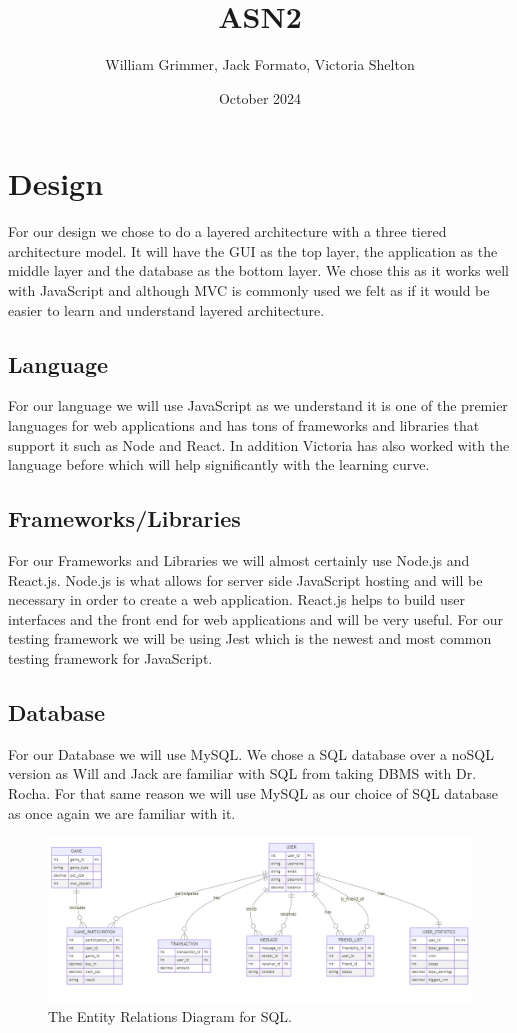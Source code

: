 \documentclass{article}
\title{ASN2}
\author{William Grimmer, Jack Formato, Victoria Shelton}
\date{October 2024}
\begin{document}
\maketitle

\section{Design}
For our design we chose to do a layered architecture with a three tiered architecture model. It will have the GUI as the top layer, the application as the middle layer and the database as the bottom layer. We chose this as it works well with JavaScript and although MVC is commonly used we felt as if it would be easier to learn and understand layered architecture.

\subsection{Language}
For our language we will use JavaScript as we understand it is one of the premier languages for web applications and has tons of frameworks and libraries that support it such as Node and React. In addition Victoria has also worked with the language before which will help significantly with the learning curve.

\subsection{Frameworks/Libraries}
For our Frameworks and Libraries we will almost certainly use Node.js and React.js. Node.js is what allows for server side JavaScript hosting and will be necessary in order to create a web application. React.js helps to build user interfaces and the front end for web applications and will be very useful. For our testing framework we will be using Jest which is the newest and most common testing framework for JavaScript.

\subsection{Database}

For our Database we will use MySQL. We chose a SQL database over a noSQL version as Will and Jack are familiar with SQL from taking DBMS with Dr. Rocha. For that same reason we will use MySQL as our choice of SQL database as once again we are familiar with it.

\begin{figure}[h]
\centering
\includegraphics[width=\linewidth]{ERD.png}
\caption{\label{fig:erd}The Entity Relations Diagram for SQL.}
\end{figure}
\end{document}
